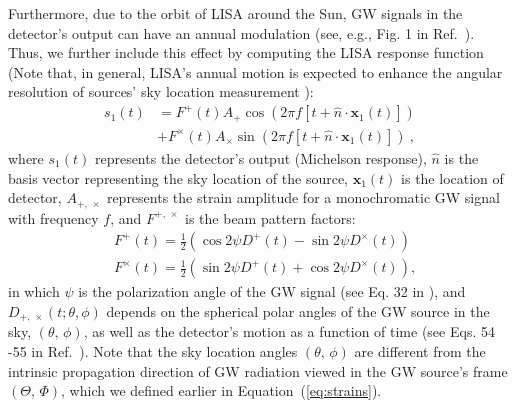 \documentclass[%
 reprint,
 amsmath,amssymb,
 aps,
]{revtex4-2}
\begin{document}
Furthermore, due to the orbit of LISA around the Sun,
GW signals in the detector's output can have an annual modulation (see, e.g., Fig. 1 in Ref.~\citep{Xuan+23b}). Thus, we further include this effect by computing the LISA response function \citep{Cornish+03} (Note that, in general, LISA's annual motion is expected to enhance the angular resolution of sources' sky location measurement \citep[see, e.g.,][]{Cutler+98}):
\begin{equation}
\begin{aligned}
s_1(t) & =F^{+}(t) A_{+} \cos \left(2 \pi f\left[t+\hat{n} \cdot \mathbf{x}_1(t)\right]\right) \\
& +F^{\times}(t) A_{\times} \sin \left(2 \pi f\left[t+\hat{n} \cdot \mathbf{x}_1(t)\right]\right) \ ,\label{eq:response}
\end{aligned}
\end{equation}
where $s_1(t)$ represents the detector's output (Michelson response), $\hat{n}$ is the basis vector representing the sky location of the source, $\mathbf{x}_1(t)$ is the location of detector, $A_{+,\, \times}$ represents the strain amplitude for a monochromatic GW signal with frequency $f$, and $F^{+,\, \times}$ is the beam pattern factors:
\begin{equation}
\begin{aligned}
& F^{+}(t)=\frac{1}{2}\left(\cos 2 \psi D^{+}(t)-\sin 2 \psi D^{\times}(t)\right) \\
& F^{\times}(t)=\frac{1}{2}\left(\sin 2 \psi D^{+}(t)+\cos 2 \psi D^{\times}(t)\right),
\end{aligned}
\end{equation}
in which $\psi$ is the polarization angle of the GW signal (see Eq. 32 in \citep{Cornish+03}), and $D_{+,\,\times}(t; \theta, \phi)$ depends on the spherical polar angles of the GW source in the sky, $(\theta, \, \phi)$, as well as the detector's motion as a function of time (see Eqs. 54 -55 in Ref.~\citep{Cornish+03}). Note that the sky location angles $(\theta,\, \phi)$ are different from the intrinsic propagation direction of GW radiation viewed in the GW source's frame $(\Theta,\, \Phi)$, which we defined earlier in Equation~(\ref{eq:strains}).
\end{document}
